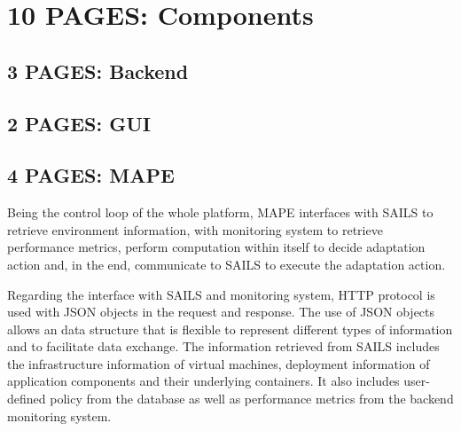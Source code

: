 \documentclass{seal_thesis}
\begin{document}
\noindent{}


\chapter{10 PAGES: Components}

\section{3 PAGES: Backend}


\section{2 PAGES: GUI}


\section{4 PAGES: MAPE}
Being the control loop of the whole platform, MAPE interfaces with SAILS to retrieve environment information, with monitoring system to retrieve performance metrics, perform computation within itself to decide adaptation action and, in the end, communicate to SAILS to execute the adaptation action.

Regarding the interface with SAILS and monitoring system, HTTP protocol is used with JSON objects in the request and response.
The use of JSON objects allows an data structure that is flexible to represent different types of information and to facilitate data exchange.
The information retrieved from SAILS includes the infrastructure information of virtual machines, deployment information of application components and their underlying containers.
It also includes user-defined policy from the database as well as performance metrics from the backend monitoring system.
\end{document}
